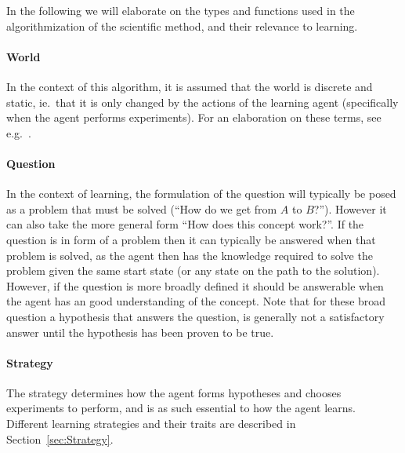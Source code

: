 \documentclass[\master/Master.tex]{subfiles}
\begin{document}
In the following we will elaborate on the types and functions used in the algorithmization of the scientific method, and their relevance to learning.

\paragraph*{World}
In the context of this algorithm, it is assumed that the world is discrete and static, ie.\ that it is only changed by the actions of the learning agent (specifically when the agent performs experiments). For an elaboration on these terms, see e.g.~\cite{Russell}. 

\paragraph*{Question}

In the context of learning, the formulation of the question will typically be posed as a problem that must be solved (``How do we get from $A$ to $B$?'').
However it can also take the more general form ``How does this concept work?''.
If the question is in form of a problem then it can typically be answered when that problem is solved, 
as the agent then has the knowledge required to solve the problem given the same start state (or any state on the path to the solution). 
However, if the question is more broadly defined it should be answerable when the agent has an good understanding of the concept. 
Note that for these broad question a hypothesis that answers the question, is generally not a satisfactory answer until the hypothesis has been proven to be true.


\paragraph*{Strategy}
The strategy determines how the agent forms hypotheses and chooses experiments to perform, and is as such essential to how the agent learns. Different learning strategies and their traits are described in Section~\ref{sec:Strategy}.
\end{document}
